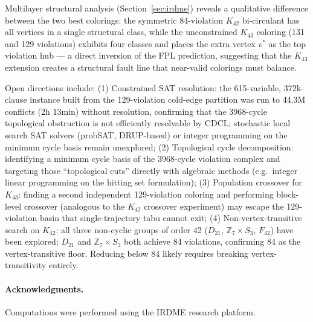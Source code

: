 \documentclass[11pt]{article}
\begin{document}
Multilayer structural analysis (Section~\ref{sec:irdme}) reveals a
qualitative difference between the two best colorings: the symmetric
84-violation $K_{42}$ bi-circulant has all vertices in a single structural class,
while the unconstrained $K_{43}$ coloring (131 and 129 violations) exhibits four classes
and places the extra vertex $v^*$ as the top violation hub
--- a direct inversion of the FPL prediction, suggesting that the
$K_{43}$ extension creates a structural fault line that near-valid
colorings must balance.

Open directions include:
(1) Constrained SAT resolution: the 615-variable, 372k-clause instance built from
    the 129-violation cold-edge partition was run to 44.3M conflicts (2h 13min) without
    resolution, confirming that the 3968-cycle topological obstruction is not efficiently
    resolvable by CDCL; stochastic local search SAT solvers (probSAT, DRUP-based)
    or integer programming on the minimum cycle basis remain unexplored;
(2) Topological cycle decomposition: identifying a minimum cycle basis of the 3968-cycle
    violation complex and targeting those ``topological cuts'' directly with algebraic methods
    (e.g.\ integer linear programming on the hitting set formulation);
(3) Population crossover for $K_{43}$: finding a second independent 129-violation coloring
    and performing block-level crossover (analogous to the $K_{42}$ crossover experiment)
    may escape the 129-violation basin that single-trajectory tabu cannot exit;
(4) Non-vertex-transitive search on $K_{42}$: all three non-cyclic groups
    of order 42 ($D_{21}$, $\mathbb{Z}_7 \times S_3$, $F_{42}$) have been
    explored; $D_{21}$ and $\mathbb{Z}_7 \times S_3$ both achieve 84 violations,
    confirming 84 as the vertex-transitive floor. Reducing below 84 likely
    requires breaking vertex-transitivity entirely.

\paragraph{Acknowledgments.}
Computations were performed using the IRDME research platform.
\end{document}
